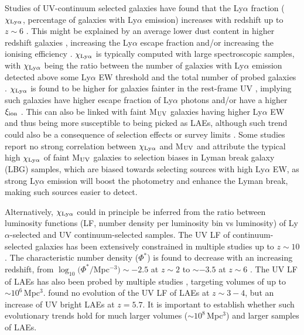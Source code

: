 \documentclass[a4paper,fleqn,usenatbib]{mnras}
\begin{document}
Studies of UV-continuum selected galaxies have found that the Ly$\alpha$ fraction ($\chi_{\rm Ly\alpha}$, percentage of galaxies with Ly$\alpha$ emission) increases with redshift up to $z\sim6$ \citep[e.g.][]{Stark2010,Pentericci2011,Cassata2015,deBarros2017,Caruana2018,Kusakabe2020}. This might be explained by an average lower dust content in higher redshift galaxies \citep[e.g.][]{Stanway2005,Bouwens2006}, increasing the Ly$\alpha$ escape fraction \citep[f$_{\rm esc, Ly\alpha}$, ratio between observed and intrinsic Ly$\alpha$ photons in a galaxy; e.g.][]{Hayes2011} and/or increasing the ionising efficiency \citep[$\xi_{\rm ion}$, number of produced ionising
photons per unit UV luminosity; e.g.][]{Matthee2017LyC}. $\chi_{\rm Ly\alpha}$ is typically computed with large spectroscopic samples, with $\chi_{\rm Ly\alpha}$ being the ratio between the number of galaxies with Ly$\alpha$ emission detected above some Ly$\alpha$ EW threshold and the total number of probed galaxies \citep[see e.g.][]{Stark2010}. $\chi_{\rm Ly\alpha}$ is found to be higher for galaxies fainter in the rest-frame UV \citep[M$_{\rm UV}$, e.g.][]{Pentericci2011}, implying such galaxies have higher escape fraction of Ly$\alpha$ photons and/or have a higher $\xi_{\rm ion}$ \citep[e.g][]{Maseda2020}. This can also be linked with faint M$_{\rm UV}$ galaxies having higher Ly$\alpha$ EW \citep[see e.g.][]{Shimizu2011,Kusakabe2018} and thus being more susceptible to being picked as LAEs, although such trend could also be a consequence of selection effects or survey limits \citep[see e.g.][]{Nilsson2009, Ando2006, Zheng2014,Hashimoto2017}. Some studies report no strong correlation between $\chi_{\rm Ly\alpha}$ and M$_{\rm UV}$ \citep[][]{Kusakabe2020} and attribute the typical high $\chi_{\rm Ly\alpha}$ of faint M$_{\rm UV}$ galaxies to selection biases in Lyman break galaxy (LBG) samples, which are biased towards selecting sources with high Ly$\alpha$ EW, as strong Ly$\alpha$ emission will boost the photometry and enhance the Lyman break, making such sources easier to detect.

Alternatively, $\chi_{\rm Ly\alpha}$ could in principle be inferred from the ratio between luminosity functions (LF, number density per luminosity bin vs luminosity) of Ly$\alpha$-selected and UV continuum-selected samples. The UV LF of continuum-selected galaxies has been extensively constrained in multiple studies up to $z\sim10$ \citep[e.g.][]{Steidel1999,Arnouts2005,Sawicki2006,Bouwens2015,Finkelstein2015,Alavi2016,Mehta2017,Ono2018}. The characteristic number density ($\Phi^*$) is found to decrease with an increasing redshift, from $\log_{10}(\Phi^*/$Mpc$^{-3})\sim-2.5$ at $z\sim2$ \citep{Reddy2009} to $\sim-3.5$ at $z\sim6$ \citep{Bouwens2015}. The UV LF of LAEs has also been probed by multiple studies \citep[see e.g.][]{Hu2004,Shimasaku2006,Ouchi2008}, targeting volumes of up to $\sim10^6$\,Mpc$^3$. \cite{Ouchi2008} found no evolution of the UV LF of LAEs at $z\sim3-4$, but an increase of UV bright LAEs at $z=5.7$. It is important to establish whether such evolutionary trends hold for much larger volumes ($\sim10^8$\,Mpc$^3$) and larger samples of LAEs.
\end{document}
